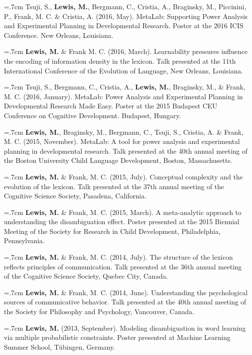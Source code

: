 \documentclass[letterpaper]{article}
\begin{document}
 \hangindent=.7cm  Tsuji, S., {\bf Lewis, M.}, Bergmann, C., Cristia, A.,  Braginsky, M.,  Piccinini, P., Frank, M. C. \& Cristia, A. (2016, May). MetaLab: Supporting Power Analysis and Experimental Planning in Developmental Research. Poster at the 2016 ICIS Conference. New Orleans, Louisiana.


  \hangindent=.7cm {\bf Lewis, M.} \& Frank M. C. (2016, March). Learnability pressures influence the encoding of information density in the lexicon. Talk presented at the 11th International Conference of the Evolution of Language, New Orleans, Louisiana.
  
  \hangindent=.7cm  Tsuji, S., Bergmann, C., Cristia, A., {\bf Lewis, M.}, Braginsky, M., \& Frank, M. C. (2016, January). MetaLab: Power Analysis and Experimental Planning in Developmental Research Made Easy. Poster at the 2015 Budapest CEU Conference on Cognitive Development. Budapest, Hungary.


\hangindent=.7cm {\bf Lewis, M.},  Braginsky,  M.,  Bergmann, C., Tsuji, S., Cristia, A. \& Frank, M. C. (2015, November). MetaLab: A tool for power analysis and experimental planning in developmental research. Talk presented at the 40th annual meeting of the Boston University Child Language Development, Boston, Massachusetts.

\hangindent=.7cm {\bf Lewis, M.} \& Frank, M. C. (2015, July). Conceptual complexity and the evolution of the lexicon. Talk presented at the 37th annual meeting of the Cognitive Science Society, Pasadena, California.

\hangindent=.7cm {\bf Lewis, M.} \& Frank, M. C. (2015, March). A meta-analytic approach to understanding the disambiguation effect. Poster presented at  the 2015 Biennial Meeting of the Society for Research in Child Development, Philadelphia, Pennsylvania.


\hangindent=.7cm {\bf Lewis, M.} \& Frank, M. C. (2014, July). The structure of the lexicon reflects  principles of communication. Talk presented at the 36th annual meeting of the Cognitive Science Society, Quebec City, Canada.

\hangindent=.7cm {\bf Lewis, M.} \& Frank, M. C. (2014, June). Understanding the psychological sources of communicative behavior. Talk presented at the 40th annual meeting of the Society for Philosophy and Psychology, Vancouver, Canada.

 \hangindent=.7cm {\bf Lewis, M.} (2013, September). Modeling disambiguation in word learning via multiple probabilistic constraints. Poster presented at Machine Learning Summer School, T\"{u}bingen, Germany.
 
\end{document}
